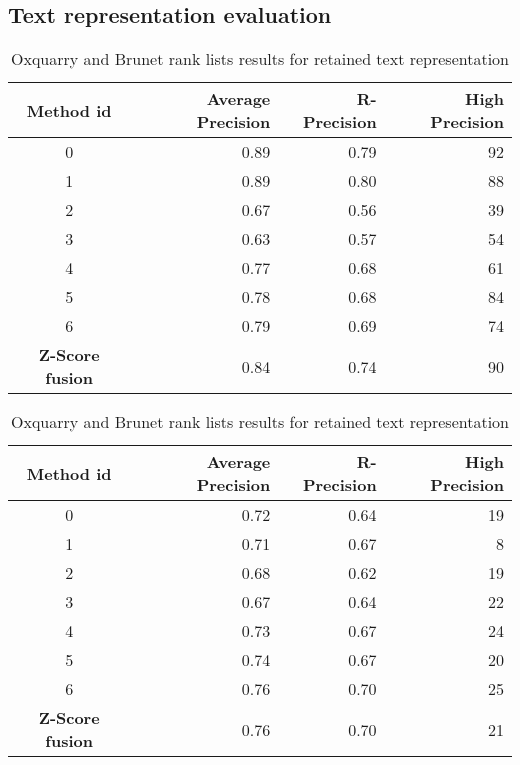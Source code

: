 \newpage
\subsection{Text representation evaluation \label{sec:annex_retained_text_representation}}

\begin{table}[H]
  \centering
  \caption{Oxquarry and Brunet rank lists results for retained text representation}
  \label{tab:9rl_results_brunet_oxquarry}

  \begin{tabular}{c r r r}
    \toprule
    Method id &
    Average Precision &
    R-Precision &
    High Precision \\
    \midrule
    0 & 0.89 & 0.79 & 92 \\
    1 & 0.89 & 0.80 & 88 \\
    2 & 0.67 & 0.56 & 39 \\
    3 & 0.63 & 0.57 & 54 \\
    4 & 0.77 & 0.68 & 61 \\
    5 & 0.78 & 0.68 & 84 \\
    6 & 0.79 & 0.69 & 74 \\
    \textbf{Z-Score fusion} &  0.84 & 0.74 & 90 \\
    \bottomrule
  \end{tabular}

  \vspace{0.5cm}

  \begin{tabular}{c r r r}
    \toprule
    Method id &
    Average Precision &
    R-Precision &
    High Precision \\
    \midrule
    0 & 0.72 & 0.64 & 19 \\
    1 & 0.71 & 0.67 &  8 \\
    2 & 0.68 & 0.62 & 19 \\
    3 & 0.67 & 0.64 & 22 \\
    4 & 0.73 & 0.67 & 24 \\
    5 & 0.74 & 0.67 & 20 \\
    6 & 0.76 & 0.70 & 25 \\
    \textbf{Z-Score fusion} & 0.76 &  0.70 & 21 \\
    \bottomrule
  \end{tabular}

\end{table}


